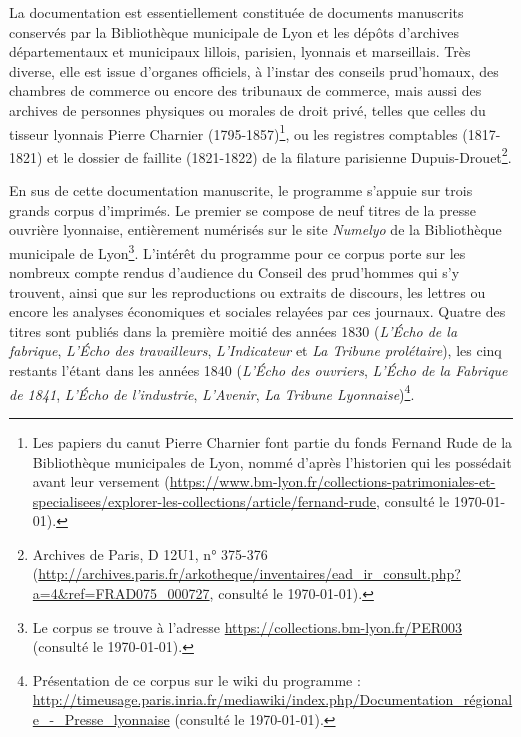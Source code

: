 La documentation est essentiellement constituée de documents manuscrits conservés par la Bibliothèque municipale de Lyon et les dépôts d'archives départementaux et municipaux lillois, parisien, lyonnais et marseillais. Très diverse, elle est issue d'organes officiels, à l'instar des conseils prud'homaux, des chambres de commerce ou encore des tribunaux de commerce, mais aussi des archives de personnes physiques ou morales de droit privé, telles que celles du tisseur lyonnais Pierre Charnier (1795-1857)\footnote{Les papiers du canut Pierre Charnier font partie du fonds \og Fernand Rude \fg{} de la Bibliothèque municipales de Lyon, nommé d'après l'historien qui les possédait avant leur versement (\url{https://www.bm-lyon.fr/collections-patrimoniales-et-specialisees/explorer-les-collections/article/fernand-rude}, consulté le \today).}, ou les registres comptables (1817-1821) et le dossier de faillite (1821-1822) de la filature parisienne Dupuis-Drouet\footnote{Archives de Paris, D 12U1, n° 375-376 (\url{http://archives.paris.fr/arkotheque/inventaires/ead_ir_consult.php?a=4&ref=FRAD075_000727}, consulté le \today).}.

En sus de cette documentation manuscrite, le programme \timeus{} s'appuie sur trois grands corpus d'imprimés. Le premier se compose de neuf titres de la presse ouvrière lyonnaise, entièrement numérisés sur le site \textit{Numelyo} de la Bibliothèque municipale de  Lyon\footnote{Le corpus se trouve à l'adresse \url{https://collections.bm-lyon.fr/PER003} (consulté le \today).}. L'intérêt du programme pour ce corpus porte sur les nombreux compte rendus d'audience du Conseil des prud'hommes qui s'y trouvent, ainsi que sur les reproductions ou extraits de discours, les lettres ou encore les analyses économiques et sociales relayées par ces journaux. Quatre des titres sont publiés dans la première moitié des années 1830 (\textit{L'Écho de la fabrique}, \textit{L’Écho des travailleurs}, \textit{L'Indicateur} et \textit{La Tribune prolétaire}), les cinq restants l'étant dans les années 1840 (\textit{L’Écho des ouvriers}, \textit{L’Écho de la Fabrique de 1841}, \textit{L’Écho de l'industrie}, \textit{L'Avenir}, \textit{La Tribune Lyonnaise})\footnote{Présentation de ce corpus sur le wiki du programme : \url{http://timeusage.paris.inria.fr/mediawiki/index.php/Documentation_régionale_-_Presse_lyonnaise} (consulté le \today).}.

